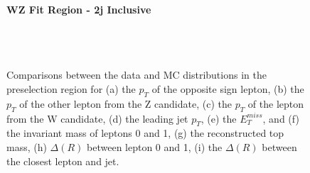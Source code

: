 \begin{figure}[H] 
    \centering
    \textbf{WZ Fit Region - 2j Inclusive}\\                                                                                
    \\                   
    \\                  
    \\
    \caption{Comparisons between the data and MC distributions in the preselection region for (a) the $p_T$ of the opposite sign lepton, (b) the $p_T$ of the other lepton from the Z candidate, (c) the $p_T$ of the lepton from the W candidate, (d) the leading jet $p_T$, (e) the $E_T^{miss}$, and (f) the invariant mass of leptons 0 and 1, (g) the reconstructed top mass, (h) $\Delta(R)$  between lepton 0 and 1, (i) the $\Delta(R)$ between the closest lepton and jet.}
    \label{kin:WP_2j_inc}
\end{figure}


